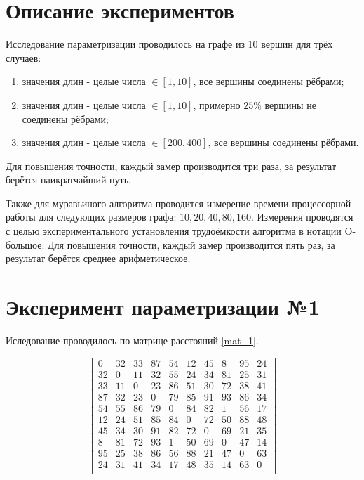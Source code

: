 \section{Описание экспериментов}
Исследование параметризации проводилось на графе из 10 вершин для трёх случаев:
\begin{enumerate}
	\item значения длин - целые числа $\in [1, 10]$, все вершины соединены рёбрами;
	\item значения длин - целые числа $\in [1, 10]$, примерно $25\%$ вершины не соединены рёбрами;
	\item значения длин - целые числа $\in [200, 400]$, все вершины соединены рёбрами.
\end{enumerate}
Для повышения точности, каждый замер производится три раза, за результат берётся наикратчайший путь.

Также для муравьиного алгоритма проводится измерение времени процессорной работы для следующих размеров графа: $10, 20, 40, 80, 160$. Измерения проводятся с целью экспериментального установления трудоёмкости алгоритма в нотации O-большое.
Для повышения точности, каждый замер производится пять раз, за результат берётся среднее арифметическое.

\section {Эксперимент параметризации №1}
Иследование проводилось по матрице расстояний \ref{mat_1}. 
\begin{scriptsize} \begin{equation}\label{mat_1}
\left[\begin{array}{cccccccccc}
	0 &     32 &    33 &    87 &    54 &    12 &    45 &    8 &     95 &    24 \\
	32 &    0 &     11 &    32 &    55 &    24 &    34 &    81 &    25 &    31 \\
	33 &    11 &    0 &     23 &    86 &    51 &    30 &    72 &    38 &    41 \\
	87 &    32 &    23 &    0 &     79 &    85 &    91 &    93 &    86 &    34 \\
	54 &    55 &    86 &    79 &    0 &     84 &    82 &    1 &     56 &    17 \\
	12 &    24 &    51 &    85 &    84 &    0 &     72 &    50 &    88 &    48 \\
	45 &    34 &    30 &    91 &    82 &    72 &    0 &     69 &    21 &    35 \\
	8 &     81 &    72 &    93 &    1 &     50 &    69 &    0 &     47 &    14 \\
	95 &    25 &    38 &    86 &    56 &    88 &    21 &    47 &    0 &     63 \\
	24 &    31 &    41 &    34 &    17 &    48 &    35 &    14 &    63 &    0 \\
\end{array}\right]
\end{equation} \end{scriptsize}


